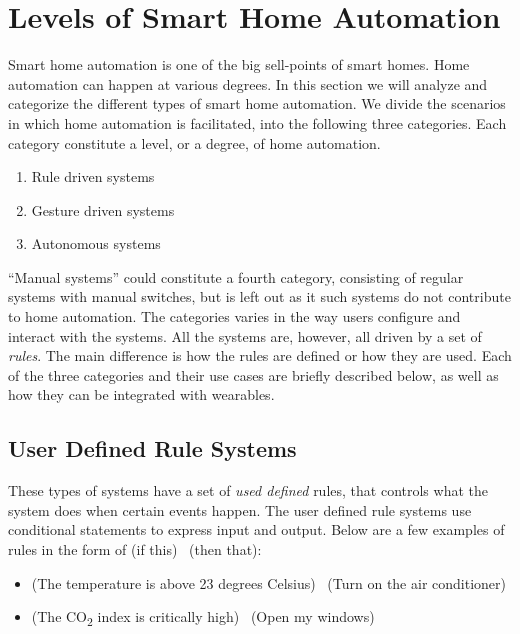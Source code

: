 \section{Levels of Smart Home Automation}\label{sec:system-categories}
Smart home automation is one of the big sell-points of smart homes.
Home automation can happen at various degrees. 
In this section we will analyze and categorize the different types of smart home automation. 
We divide the scenarios in which home automation is facilitated, 
into the following three categories. Each category constitute a level, or a degree, of home automation.

\begin{enumerate}
    \item Rule driven systems
    \item Gesture driven systems
    \item Autonomous systems
\end{enumerate}

``Manual systems'' could constitute a fourth category, consisting of regular systems with manual switches,
but is left out as it such systems do not contribute to home automation.
The categories varies in the way users configure and interact with the systems. 
All the systems are, however, all driven by a set of \emph{rules}. 
The main difference is how the rules are defined or how they are used.
Each of the three categories and their use cases are briefly described below,
as well as how they can be integrated with wearables.

\subsection{User Defined Rule Systems}

These types of systems have a set of \emph{used defined} rules, 
that controls what the system does when certain events happen. 
The user defined rule systems use conditional statements to express input and output. 
Below are a few examples of rules in the form of (if this) \textrightarrow~(then that):

\begin{itemize}
    \item (The temperature is above 23 degrees Celsius) \textrightarrow~(Turn on the air conditioner)
    \item (The CO\textsubscript{2} index is critically high) \textrightarrow~(Open my windows)
\end{itemize}

